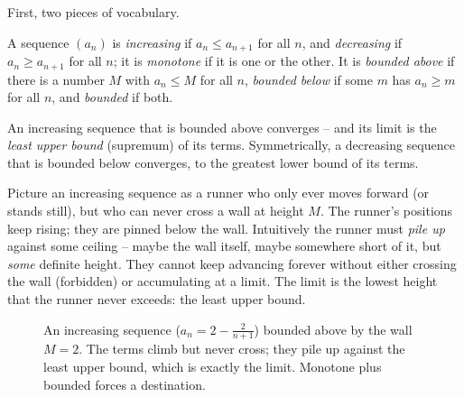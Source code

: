 First, two pieces of vocabulary.

\begin{definition}
\label{ch28:def-monotone}
A sequence $(a_n)$ is \emph{increasing} if $a_n \le a_{n+1}$ for all $n$, and
\emph{decreasing} if $a_n \ge a_{n+1}$ for all $n$; it is \emph{monotone} if it
is one or the other. It is \emph{bounded above} if there is a number $M$ with
$a_n \le M$ for all $n$, \emph{bounded below} if some $m$ has $a_n \ge m$ for all
$n$, and \emph{bounded} if both.
\end{definition}

\begin{theorem}
\label{ch28:thm-mct}
An increasing sequence that is bounded above converges -- and its limit is the
\emph{least upper bound} (supremum) of its terms. Symmetrically, a decreasing
sequence that is bounded below converges, to the greatest lower bound of its
terms.
\end{theorem}

\begin{intuitionbox}
Picture an increasing sequence as a runner who only ever moves forward (or stands
still), but who can never cross a wall at height $M$. The runner's positions keep
rising; they are pinned below the wall. Intuitively the runner must \emph{pile
up} against some ceiling -- maybe the wall itself, maybe somewhere short of it,
but \emph{some} definite height. They cannot keep advancing forever without
either crossing the wall (forbidden) or accumulating at a limit. The limit is the
lowest height that the runner never exceeds: the least upper bound.
\end{intuitionbox}

\begin{figure}[H]
\centering
{}
\caption{An increasing sequence ($a_n = 2 - \tfrac{2}{n+1}$) bounded above by the
wall $M = 2$. The terms climb but never cross; they pile up against the least
upper bound, which is exactly the limit. Monotone plus bounded forces a
destination.}
\label{ch28:fig-mct}
\end{figure}

